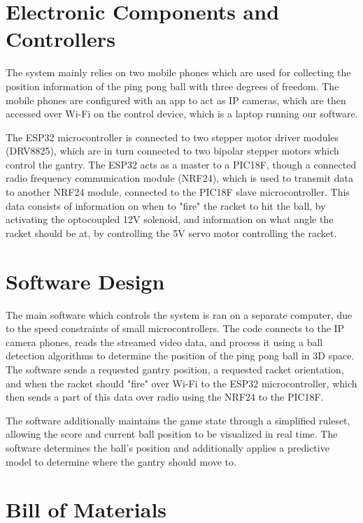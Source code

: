 \section{Electronic Components and Controllers}
The system mainly relies on two mobile phones which are used for collecting the position information of the ping pong ball with three degrees of freedom. The mobile phones are configured with an app to act as IP cameras, which are then accessed over Wi-Fi on the control device, which is a laptop running our software.

The ESP32 microcontroller is connected to two stepper motor driver modules (DRV8825), which are in turn connected to two bipolar stepper motors which control the gantry. The ESP32 acts as a master to a PIC18F, though a connected radio frequency communication module (NRF24), which is used to transmit data to another NRF24 module, connected to the PIC18F slave microcontroller. This data consists of information on when to "fire" the racket to hit the ball, by activating the optocoupled 12V solenoid, and information on what angle the racket should be at, by controlling the 5V servo motor controlling the racket.

\section{Software Design}
The main software which controls the system is ran on a separate computer, due to the speed constraints of small microcontrollers. The code connects to the IP camera phones, reads the streamed video data, and process it using a ball detection algorithms to determine the position of the ping pong ball in 3D space. The software sends a requested gantry position, a requested racket orientation, and when the racket should "fire" over Wi-Fi to the ESP32 microcontroller, which then sends a part of this data over radio using the NRF24 to the PIC18F.

The software additionally maintains the game state through a simplified ruleset, allowing the score and current ball position to be visualized in real time. The software determines the ball's position and additionally applies a predictive model to determine where the gantry should move to.

\section{Bill of Materials}

